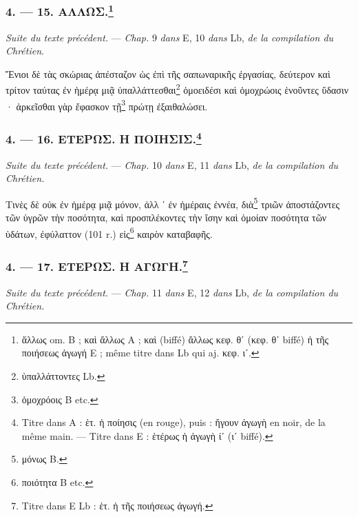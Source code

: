 \documentclass[a4paper, 11pt, oneside, polutonikogreek, french]{article}
\begin{document}
\bigskip
\centerline{\EightStarTaper}
\centerline{\EightStarTaper\EightStarTaper}
\bigskip

\subsubsection[4. --- 15. ΑΛΛΩΣ.]{4. --- 15. ΑΛΛΩΣ.\footnote{ἄλλως om. B ; καὶ ἄλλως A ; καὶ (biffé) ἄλλως κεφ. θʹ (κεφ. θʹ biffé) ἡ τῆς ποιήσεως ἀγωγή E ; même titre dans Lb qui aj. κεφ. ιʹ.}}

\emph{Suite du texte précédent.} --- \emph{Chap.} 9 \emph{dans} E, 10 \emph{dans} Lb, \emph{de la compilation du Chrétien}.

Ἔνιοι δὲ τὰς σκώριας ἀπέσταζον ὡς ἐπὶ τῆς σαπωναρικῆς ἐργασίας, δεύτερον καὶ τρίτον ταύτας ἐν ἡμέρᾳ μιᾷ ὑπαλλάττεσθαι\footnote{ὑπαλλάττοντες Lb.} ὁμοειδέσι καὶ ὁμοχρώοις ἑνοῦντες ὕδασιν · ἀρκεῖσθαι γὰρ ἔφασκον τῇ\footnote{ὁμοχρόοις B etc.} πρώτῃ ἐξαιθαλώσει.

\bigskip
\centerline{\EightStarTaper}
\centerline{\EightStarTaper\EightStarTaper}
\bigskip

\subsubsection[4. --- 16. ΕΤΕΡΩΣ. Η ΠΟΙΗΣΙΣ.]{4. --- 16. ΕΤΕΡΩΣ. Η ΠΟΙΗΣΙΣ.\footnote{Titre dans A : ἑτ. ἡ ποίησις (en rouge), puis : ἤγουν ἀγωγὴ en noir, de la même main. --- Titre dans E : ἑτέρως ἡ ἀγωγὴ ίʹ (ιʹ biffé).}}

\emph{Suite du texte précédent.} --- \emph{Chap.} 10 \emph{dans} E, 11 \emph{dans} Lb, \emph{de la compilation du Chrétien.}

Τινὲς δὲ οὐκ ἐν ἡμέρᾳ μιᾷ μόνον, ἀλλ ᾽ ἐν ἡμέραις ἐννέα, διὰ\footnote{μόνως B.} τριῶν ἀποστάζοντες τῶν ὑγρῶν τὴν ποσότητα, καὶ προσπλέκοντες τὴν ἴσην καὶ ὁμοίαν ποσότητα τῶν ὑδάτων, ἐφύλαττον (101 r.) εἰς\footnote{ποιότητα B etc.} καιρὸν καταβαφῆς.

\bigskip
\centerline{\EightStarTaper}
\centerline{\EightStarTaper\EightStarTaper}
\bigskip

\subsubsection[4. --- 17. ΕΤΕΡΩΣ. Η ΑΓΩΓΗ.]{4. --- 17. ΕΤΕΡΩΣ. Η ΑΓΩΓΗ.\footnote{Titre dans E Lb : ἑτ. ἡ τῆς ποιήσεως ἀγωγή.}}

\emph{Suite du texte précédent.} --- \emph{Chap.} 11 \emph{dans} E, 12 \emph{dans} Lb, \emph{de la compilation du Chrétien.}
\end{document}
